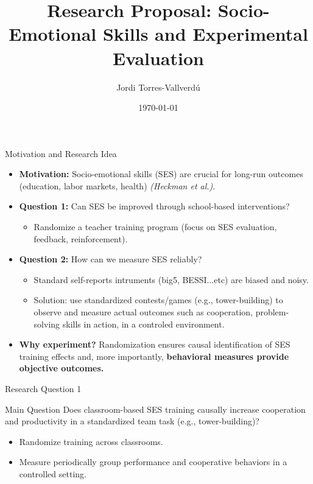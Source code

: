 \documentclass{beamer}
\title{Research Proposal: Socio-Emotional Skills and Experimental Evaluation}
\author{Jordi Torres-Vallverdú}
\date{\today}
\begin{document}
\frame{\titlepage}

\begin{frame}{Motivation and Research Idea}
    \begin{itemize}
        \item \textbf{Motivation:} Socio-emotional skills (SES) are crucial for long-run outcomes 
              (education, labor markets, health) \textit{(Heckman et al.)}.
        \vspace{0.3cm}
        \item \textbf{Question 1:} Can SES be improved through school-based interventions?
        \begin{itemize}
            \item Randomize a teacher training program (focus on SES evaluation, feedback, reinforcement).
        \end{itemize}
        \vspace{0.3cm}
        \item \textbf{Question 2:} How can we measure SES reliably?
        \begin{itemize}
            \item Standard self-reports intruments (big5, BESSI...etc) are biased and noisy.
            \item Solution: use standardized contests/games (e.g., tower-building) to observe and measure actual outcomes such as 
                  cooperation, problem-solving skills in action, in a controled environment.
        \end{itemize}
        \vspace{0.3cm}
        \item \textbf{Why experiment?} Randomization ensures causal identification of SES training 
              effects and, more importantly, \textbf{behavioral measures provide objective outcomes.}
    \end{itemize}
\end{frame}


\begin{frame}{Research Question 1}
    \begin{block}{Main Question}
        Does classroom-based SES training causally increase cooperation and productivity in a standardized team task (e.g., tower-building)?
    \end{block}
    \begin{itemize}
        \item Randomize training across classrooms.
        \item Measure periodically group performance and cooperative behaviors in a controlled setting. 
    \end{itemize}
\end{frame}
\end{document}
